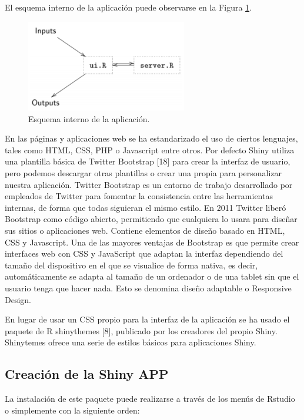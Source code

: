 El esquema interno de la aplicación puede observarse en la Figura \ref{fig:fig321}. 

\begin{figure}[h]
\begin{center}
\includegraphics[width=7cm]{./Graficos/figura7}
\end{center}
\caption{Esquema interno de la aplicación.}
\label{fig:fig321}
\end{figure}


En las páginas y aplicaciones web se ha estandarizado el uso de ciertos lenguajes, tales como HTML, CSS, PHP o Javascript entre otros. Por defecto Shiny utiliza una plantilla básica de Twitter Bootstrap [18] para crear la interfaz de usuario, pero podemos descargar otras plantillas o crear una propia para personalizar nuestra aplicación. Twitter Bootstrap es un entorno de trabajo desarrollado por empleados de Twitter para fomentar la consistencia entre las herramientas internas, de forma que todas siguieran el mismo estilo. En 2011 Twitter liberó Bootstrap como código abierto, permitiendo que cualquiera lo usara para diseñar sus sitios o aplicaciones web. Contiene elementos de diseño basado en HTML, CSS y Javascript. Una de las mayores ventajas de Bootstrap es que permite crear interfaces web con CSS y JavaScript que adaptan la interfaz dependiendo del tamaño del dispositivo en el que se visualice de forma nativa, es decir, automáticamente se adapta al tamaño de un ordenador o de una tablet sin que el usuario tenga que hacer nada. Esto se denomina diseño adaptable o Responsive Design.

En lugar de usar un CSS propio para la interfaz de la aplicación se ha usado el paquete de R shinythemes [8], publicado por los creadores del propio Shiny. Shinytemes ofrece una serie de estilos básicos para aplicaciones Shiny.



\subsection{Creación de la Shiny APP}
La instalación de este paquete puede realizarse a través de los menús de Rstudio o simplemente con la siguiente orden:\\

